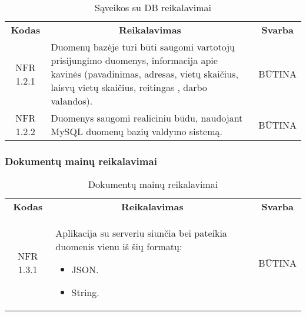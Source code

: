 \documentclass{VUMIFPSkursinis}
\begin{document}
\begin{center}
	\begin{table}[H]
	\begin{tabular}{|p{2cm}|p{}|p{}|}
	\hline
	    \rowcolor{lightgray}
		\multicolumn{3}{|c|}{Sąveikos su DB reikalavimai}\\
		
	\hline
		\multicolumn{1}{|c|}{{\bfseries Kodas}}&
		\multicolumn{1}{|c|}{{\bfseries Reikalavimas}}&
		\multicolumn{1}{|c|}{{\bfseries Svarba}}\\
	\hline 	
		\multicolumn{1}{|c|}{NFR 1.2.1}&
		{Duomenų bazėje turi būti saugomi vartotojų prisijungimo duomenys, informacija apie kavinės (pavadinimas, adresas, vietų skaičius, laisvų vietų skaičius, reitingas , darbo valandos).}&
		\multicolumn{1}{|c|}{BŪTINA}\\	
	
	\hline 	
		\multicolumn{1}{|c|}{NFR 1.2.2}&
		{Duomenys saugomi realiciniu būdu, naudojant MySQL duomenų bazių valdymo sistemą.}&
		\multicolumn{1}{|c|}{BŪTINA}\\	
	
	\hline  	 	
	\end{tabular}
	\caption{Sąveikos su DB reikalavimai}
	\label{table:SąveikossuDBreikalavimai}
	\end{table}

\end{center}

\subsubsection{Dokumentų mainų reikalavimai}

\begin{center}
	\begin{table}[H]
	\begin{tabular}{|p{2cm}|p{}|p{}|}
	\hline
	    \rowcolor{lightgray}
		\multicolumn{3}{|c|}{Dokumentų mainų reikalavimai}\\
		
	\hline
		\multicolumn{1}{|c|}{{\bfseries Kodas}}&
		\multicolumn{1}{|c|}{{\bfseries Reikalavimas}}&
		\multicolumn{1}{|c|}{{\bfseries Svarba}}\\
	\hline 	
		\multicolumn{1}{|c|}{NFR 1.3.1}&
		{Aplikacija su serveriu siunčia bei pateikia duomenis vienu iš šių formatų:
			\begin{itemize}
			\item JSON.
			\item String.
			\end{itemize}}&
		\multicolumn{1}{|c|}{BŪTINA}\\	
	
	\hline 	 	 	
	\end{tabular}
	\caption{Dokumentų mainų reikalavimai}
	\label{table:Dokumentųmainųreikalavimai}
	\end{table}

\end{center}
\end{document}
